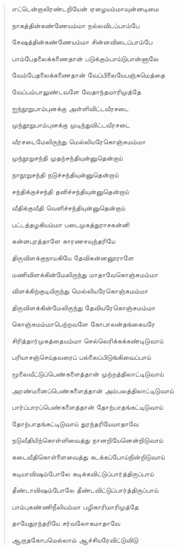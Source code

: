 \documentclass{article}
\begin{document}
\begin{quotation}
{எட்டென்றாலிரண்டறியேன் ஏழையம்மாவுன்னடிமை

நாகத்தின்கண்ணேயம்மா நல்லவிடப்பாம்பே

சேஷத்தின்கண்ணேயம்மா சின்னவிடைப்பாம்பே

பாம்பேதலைக்கணைதான் படுக்கும்பாய்டுபான்னாலே

வேம்பேதலைக்கணைதான் வேப்பிலையேபஞ்சுமெத்தை

வேப்பம்பாலுண்டவளே வேதாந்தமாரிமுத்தே

ஐந்நூறுபாம்புனக்கு அள்ளிவிட்டவீரசடை

முந்தூறுபாம்புனக்கு முடிந்துவிட்டவீரசடை

வீரசடைமேலிருந்து மெல்லியரேகொஞ்சுமம்மா

முந்நூறுசந்தி முதற்சந்தியுன்னுதென்றாய்

நாநூறுசந்தி நடுச்சந்தியுன்னுதென்றாய்

சந்திக்குச்சந்தி தனிச்சந்தியுன்னுதென்றாய்

வீதிக்குவீதி வெளிச்சந்தியுன்னுதென்றாய்

பட்டத்தழகியம்மா படைமுகத்துராசகன்னி

கன்னபுரத்தாளே காரணசவுந்தரியே

திருவிளக்குநாயகியே தேவிகன்னனூராளே

மணிவிளக்கின்மேலிருந்து மாதாவேகொஞ்சுமம்மா

விளக்கிற்குடியிருந்து மெல்லியரேகொஞ்சுமம்மா

திருவிளக்கின்மேலிருந்து தேவியரேகொஞ்சுமம்மா

கொஞ்சுமம்மாபெற்றவளே கோபாலன்தங்கையரே

சிரித்தார்முகத்தையம்மா செல்லெரிக்கக்கண்டிடுவாய்

பரியாசஞ்செய்தவரைப் பல்லைப்பிடுங்கிவைப்பாய்

மூலைவீட்டுப்பெண்களைத்தான் முற்றத்திலாட்டிடுவாய்

அரண்மனைப்பெண்களைத்தான் அம்பலத்திலாட்டிடுவாய்

பார்ப்பாரப்பெண்களைத்தான் தோற்பாதங்கட்டிடுவாய்

தோற்பாதங்கட்டிடுவாய் துரந்தரியேமாதாவே

நடுவீதியிற்கொள்ளிவைத்து நானறியேனென்றிடுவாய்

கடைவீதிகொள்ளைவைத்து கடக்கப்போய்நின்றிடுவாய்

கடியாவிஷம்போலே கடிக்கவிட்டுப்பார்த்திருப்பாய்

தீண்டாவிஷம்போலே தீண்டவிட்டுப்பார்த்திருப்பாய்

பாம்புகண்ணிநீலியம்மா பழிகாரிமாரிமுத்தே

தாயேதுரந்தரியே சர்வலோகமாதாவே

ஆறாதகோபமெல்லாம் ஆச்சியரேவிட்டுவிடு

}
\end{quotation}
\end{document}
